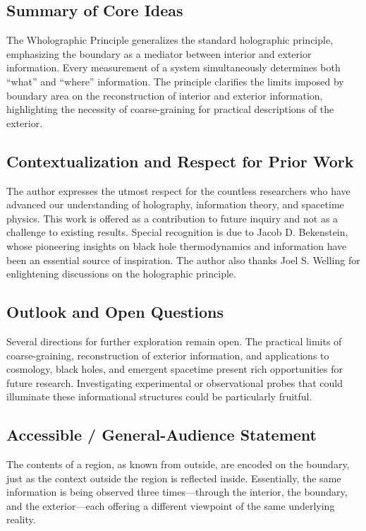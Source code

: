 ﻿\documentclass[12pt]{article}
\begin{document}
\subsection*{Summary of Core Ideas}
The Wholographic Principle generalizes the standard holographic principle, emphasizing the boundary as a mediator between interior and exterior information. Every measurement of a system simultaneously determines both ``what'' and ``where'' information. The principle clarifies the limits imposed by boundary area on the reconstruction of interior and exterior information, highlighting the necessity of coarse-graining for practical descriptions of the exterior.


\subsection*{Contextualization and Respect for Prior Work}
The author expresses the utmost respect for the countless researchers who have advanced our understanding of holography, information theory, and spacetime physics. This work is offered as a contribution to future inquiry and not as a challenge to existing results. Special recognition is due to Jacob D. Bekenstein, whose pioneering insights on black hole thermodynamics and information have been an essential source of inspiration. The author also thanks Joel S. Welling for enlightening discussions on the holographic principle.


\subsection*{Outlook and Open Questions}
Several directions for further exploration remain open. The practical limits of coarse-graining, reconstruction of exterior information, and applications to cosmology, black holes, and emergent spacetime present rich opportunities for future research. Investigating experimental or observational probes that could illuminate these informational structures could be particularly fruitful.


\subsection*{Accessible / General-Audience Statement}
The contents of a region, as known from outside, are encoded on the boundary, just as the context outside the region is reflected inside. Essentially, the same information is being observed three times—through the interior, the boundary, and the exterior—each offering a different viewpoint of the same underlying reality.
\end{document}
